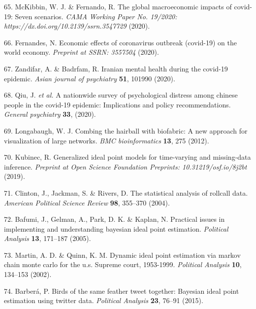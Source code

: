 \documentclass[]{article}
\begin{document}
\leavevmode\hypertarget{ref-mckibbin2020global}{}%
65. McKibbin, W. J. \& Fernando, R. The global macroeconomic impacts of covid-19: Seven scenarios. \emph{CAMA Working Paper No. 19/2020: https://dx.doi.org/10.2139/ssrn.3547729} (2020).

\leavevmode\hypertarget{ref-fernandes2020economic}{}%
66. Fernandes, N. Economic effects of coronavirus outbreak (covid-19) on the world economy. \emph{Preprint at SSRN: 3557504} (2020).

\leavevmode\hypertarget{ref-zandifar2020iranian}{}%
67. Zandifar, A. \& Badrfam, R. Iranian mental health during the covid-19 epidemic. \emph{Asian journal of psychiatry} \textbf{51}, 101990 (2020).

\leavevmode\hypertarget{ref-qiu2020nationwide}{}%
68. Qiu, J. \emph{et al.} A nationwide survey of psychological distress among chinese people in the covid-19 epidemic: Implications and policy recommendations. \emph{General psychiatry} \textbf{33}, (2020).

\leavevmode\hypertarget{ref-longabaugh2012}{}%
69. Longabaugh, W. J. Combing the hairball with biofabric: A new approach for visualization of large networks. \emph{BMC bioinformatics} \textbf{13}, 275 (2012).

\leavevmode\hypertarget{ref-kubinec2019ideal}{}%
70. Kubinec, R. Generalized ideal point models for time-varying and missing-data inference. \emph{Preprint at Open Science Foundation Preprints: 10.31219/osf.io/8j2bt} (2019).

\leavevmode\hypertarget{ref-jackman2004}{}%
71. Clinton, J., Jackman, S. \& Rivers, D. The statistical analysis of rollcall data. \emph{American Political Science Review} \textbf{98}, 355--370 (2004).

\leavevmode\hypertarget{ref-gelman2005}{}%
72. Bafumi, J., Gelman, A., Park, D. K. \& Kaplan, N. Practical issues in implementing and understanding bayesian ideal point estimation. \emph{Political Analysis} \textbf{13}, 171--187 (2005).

\leavevmode\hypertarget{ref-quinn2002}{}%
73. Martin, A. D. \& Quinn, K. M. Dynamic ideal point estimation via markov chain monte carlo for the u.s. Supreme court, 1953-1999. \emph{Political Analysis} \textbf{10}, 134--153 (2002).

\leavevmode\hypertarget{ref-barbera2015}{}%
74. Barberá, P. Birds of the same feather tweet together: Bayesian ideal point estimation using twitter data. \emph{Political Analysis} \textbf{23}, 76--91 (2015).
\end{document}
